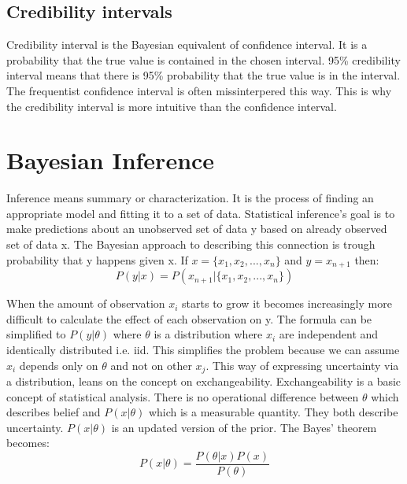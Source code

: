 \subsection*{Credibility intervals}\label{CredibilityIntervals}
Credibility interval is the Bayesian equivalent of confidence interval. It is a probability that the true value is contained in the chosen interval. 95\% credibility interval means that there is 95\% probability that the true value is in the interval. The frequentist confidence interval is often missinterpered this way. This is why the credibility interval is more intuitive than the confidence interval.\cite{FornaconWood2022UnderstandingTD}

\section{Bayesian Inference}\label{BayesianInference}
Inference means summary or characterization\cite{Robert2007TheBC}. It is the process of finding an appropriate model and fitting it to a set of data.\cite{Gel2014BayesianDA} Statistical inference's goal is to make predictions about an unobserved set of data y based on already observed set of data x.\cite{Lindley1990The1W}\cite{Gel2014BayesianDA} The Bayesian approach to describing this connection is trough probability that y happens given x. If $x = \{x_1, x_2, ..., x_n \}$ and $y = x_{n + 1}$ then:
\begin{equation}
P(y|x) = P(x_{n + 1}|\{x_1, x_2, ..., x_n \})
\end{equation}

When the amount of observation $x_i$ starts to grow it becomes increasingly more difficult to calculate the effect of each observation on y. The formula can be simplified to $P(y|\theta)$ where $\theta$ is a distribution where $x_i$ are independent and identically distributed i.e. iid. This simplifies the problem because we can assume $x_i$ depends only on $\theta$ and not on other $x_j$.\cite{Lindley1990The1W} This way of expressing uncertainty via a distribution, leans on the concept on exchangeability. Exchangeability is a basic concept of statistical analysis. \cite{Gel2014BayesianDA}  There is no operational difference between $\theta$ which describes belief and $P(x|\theta)$ which is a measurable quantity. They both describe uncertainty. $P(x|\theta)$ is an updated version of the prior. The Bayes' theorem becomes: 
\begin{equation}
P(x|\theta) = \frac{P(\theta|x)P(x)}{P(\theta)}
\end{equation}
\cite{Pawitan2002InAL}

